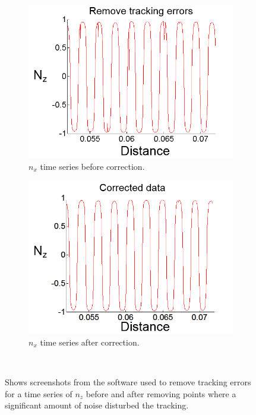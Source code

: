 \begin{figure}[H]
\centering
\begin{subfigure}[3a]{0.40\textwidth}
\includegraphics[width=\textwidth]{figures/method/Brushing1.png}
\caption{$n_x$ time series before correction.}\label{fig:prebrush}
\end{subfigure}\hspace{1em}%
\begin{subfigure}[3b]{0.40\textwidth}
\includegraphics[width=\textwidth]{figures/method/Brushing2.png}
\caption{$n_x$ time series after correction.}\label{fig:postbrush}
\end{subfigure} \\
\caption{Shows screenshots from the software used to remove tracking errors for a time series of $n_z$ before and after removing points where a significant amount of noise disturbed the tracking.} \label{fig:brushed}
\end{figure}
